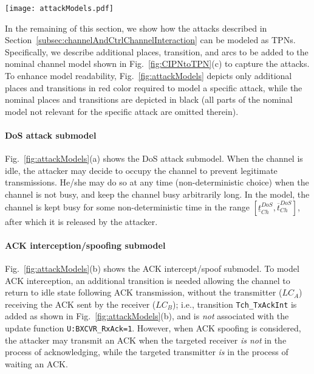 %
\begin{figure*}[t]
\vspace{-10pt}
	\centering
	\texttt{[image: attackModels.pdf]}
	\caption{Additional places, transitions, and arcs required to obtain a security-aware channel model for different attack types: (a) DoS, (b) ACK intercept/spoof, (c) message modification, and (d) masquerade. All attack-related components of the model are depicted in red color, while nominal components are shown partially for completeness in black (where relevant).}
	\label{fig:attackModels}
\end{figure*}
%
%
In the remaining of this section, we show how  the attacks described in Section~\ref{subsec:channelAndCtrlChannelInteraction} can be modeled as TPNs. Specifically, we describe additional places, transition, and arcs to be added to the nominal channel model shown in Fig.~\ref{fig:CIPNtoTPN}(c) to capture the attacks. To enhance model readability, Fig.~\ref{fig:attackModels} depicts only additional places and transitions in red color required to model a specific attack, while the nominal places and transitions are depicted in black (all parts of the nominal model not relevant for the specific attack are omitted therein).

\paragraph{DoS attack submodel} Fig.~\ref{fig:attackModels}(a) shows the DoS attack submodel. When the channel is idle, the attacker may decide to occupy the channel to prevent legitimate transmissions. He/she may do so at any time (non-deterministic choice) when the channel is not busy, and keep the channel busy arbitrarily long. In the model, the channel is kept busy for some non-deterministic time in the range $[\underline{t}_{Ch}^{DoS},\overline{t}_{Ch}^{DoS}]$, after which it is released by the attacker.%

\paragraph{ACK interception/spoofing submodel} Fig.~\ref{fig:attackModels}(b) shows the ACK intercept/spoof submodel. To model ACK interception, an additional transition is needed allowing the channel to return to idle state following ACK transmission, without the transmitter ($LC_A$) receiving the ACK sent by the receiver ($LC_B$); i.e., transition \verb!Tch_TxAckInt! is added as shown in Fig.~\ref{fig:attackModels}(b), and is \emph{not} associated with the update function \verb!U:BXCVR_RxAck=1!.
However, when ACK spoofing is considered, the attacker may transmit an ACK when the targeted receiver \emph{is not} in the process of acknowledging, while the targeted transmitter \emph{is} in the process of waiting an ACK.

